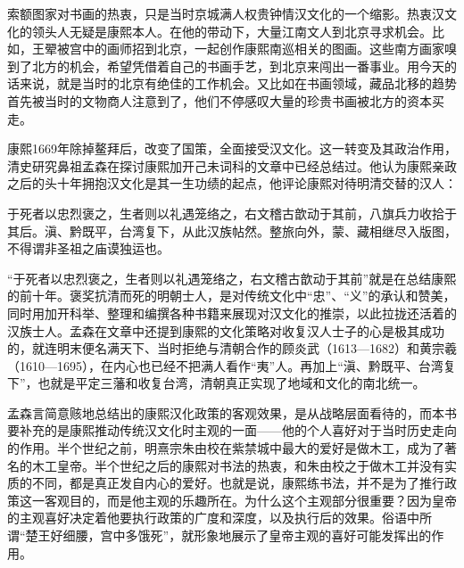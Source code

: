 
索额图家对书画的热衷，只是当时京城满人权贵钟情汉文化的一个缩影。热衷汉文化的领头人无疑是康熙本人。在他的带动下，大量江南文人到北京寻求机会。比如，王翚被宫中的画师招到北京，一起创作康熙南巡相关的图画。这些南方画家嗅到了北方的机会，希望凭借着自己的书画手艺，到北京来闯出一番事业。用今天的话来说，就是当时的北京有绝佳的工作机会。又比如在书画领域，藏品北移的趋势首先被当时的文物商人注意到了，他们不停感叹大量的珍贵书画被北方的资本买走。



康熙1669年除掉鳌拜后，改变了国策，全面接受汉文化。这一转变及其政治作用，清史研究鼻祖孟森在探讨康熙加开己未词科的文章中已经总结过。他认为康熙亲政之后的头十年拥抱汉文化是其一生功绩的起点，他评论康熙对待明清交替的汉人：



\begin{bookquote}于死者以忠烈褒之，生者则以礼遇笼络之，右文稽古歆动于其前，八旗兵力收拾于其后。滇、黔既平，台湾复下，从此汉族帖然。整旅向外，蒙、藏相继尽入版图，不得谓非圣祖之庙谟独运也。\end{bookquote}


“于死者以忠烈褒之，生者则以礼遇笼络之，右文稽古歆动于其前”就是在总结康熙的前十年。褒奖抗清而死的明朝士人，是对传统文化中“忠”、“义”的承认和赞美，同时用加开科举、整理和编撰各种书籍来展现对汉文化的推崇，以此拉拢还活着的汉族士人。孟森在文章中还提到康熙的文化策略对收复汉人士子的心是极其成功的，就连明末便名满天下、当时拒绝与清朝合作的顾炎武（1613—1682）和黄宗羲（1610—1695），在内心也已经不把满人看作“夷”人。再加上“滇、黔既平、台湾复下”，也就是平定三藩和收复台湾，清朝真正实现了地域和文化的南北统一。



孟森言简意赅地总结出的康熙汉化政策的客观效果，是从战略层面看待的，而本书要补充的是康熙推动传统汉文化时主观的一面——他的个人喜好对于当时历史走向的作用。半个世纪之前，明熹宗朱由校在紫禁城中最大的爱好是做木工，成为了著名的木工皇帝。半个世纪之后的康熙对书法的热衷，和朱由校之于做木工并没有实质的不同，都是真正发自内心的爱好。也就是说，康熙练书法，并不是为了推行政策这一客观目的，而是他主观的乐趣所在。为什么这个主观部分很重要？因为皇帝的主观喜好决定着他要执行政策的广度和深度，以及执行后的效果。俗语中所谓“楚王好细腰，宫中多饿死”，就形象地展示了皇帝主观的喜好可能发挥出的作用。



